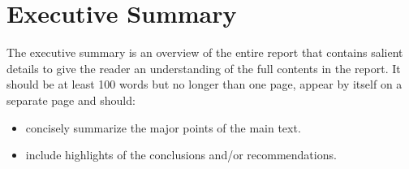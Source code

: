 \hspace{0pt}
\vfill
\section*{Executive Summary}

The executive summary is an overview of the entire report that contains salient details to give the reader an understanding of the full contents in the report. It should be at least 100 words but no longer than one page, appear by itself on a separate page and should:

\begin{itemize}
  \item concisely summarize the major points of the main text.
  \item include highlights of the conclusions and/or recommendations.
\end{itemize}

\vfill
\hspace{0pt}
